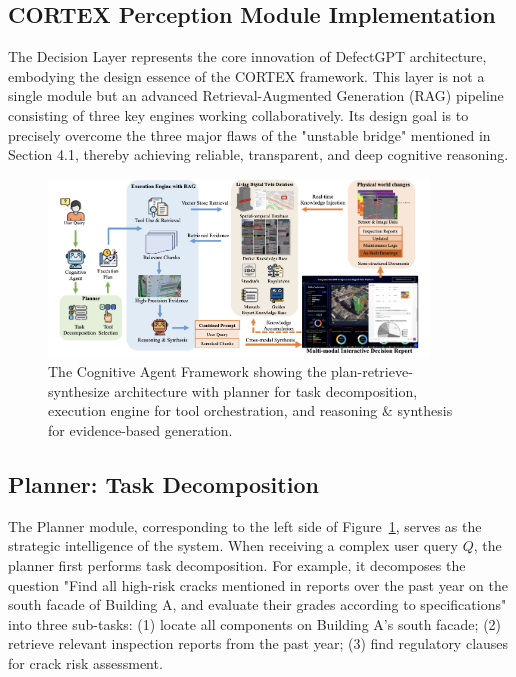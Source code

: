 \subsection{CORTEX Perception Module Implementation}

The Decision Layer represents the core innovation of DefectGPT architecture, embodying the design essence of the CORTEX framework. This layer is not a single module but an advanced Retrieval-Augmented Generation (RAG) pipeline consisting of three key engines working collaboratively. Its design goal is to precisely overcome the three major flaws of the "unstable bridge" mentioned in Section 4.1, thereby achieving reliable, transparent, and deep cognitive reasoning.

\begin{figure}[htbp]
\centering
\includegraphics[width=0.9\textwidth]{figures/DefectGPT/cognitive_agent_framework.png}
\caption{The Cognitive Agent Framework showing the plan-retrieve-synthesize architecture with planner for task decomposition, execution engine for tool orchestration, and reasoning \& synthesis for evidence-based generation.}
\label{fig:cognitive-agent-framework}
\end{figure}

\subsection{Planner: Task Decomposition}

The Planner module, corresponding to the left side of Figure~\ref{fig:cognitive-agent-framework}, serves as the strategic intelligence of the system. When receiving a complex user query $Q$, the planner first performs task decomposition. For example, it decomposes the question "Find all high-risk cracks mentioned in reports over the past year on the south facade of Building A, and evaluate their grades according to specifications" into three sub-tasks: (1) locate all components on Building A's south facade; (2) retrieve relevant inspection reports from the past year; (3) find regulatory clauses for crack risk assessment.

